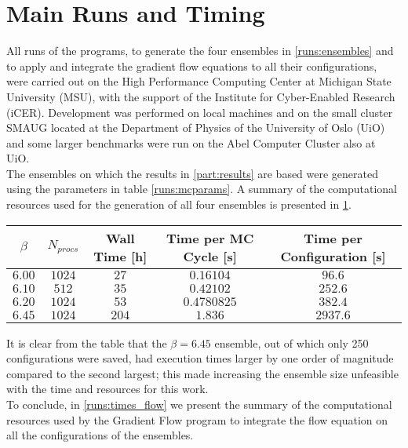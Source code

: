 \section{Main Runs and Timing}
All runs of the programs, to generate the four ensembles in \cref{runs:ensembles} and to apply and integrate the gradient flow equations to all their configurations, were carried out on the High Performance Computing Center at Michigan State University (MSU), with the support of the Institute for Cyber-Enabled Research (iCER). Development was performed on local machines and on the small cluster SMAUG located at the Department of Physics of the University of Oslo (UiO) and some larger benchmarks were run on the Abel Computer Cluster also at UiO.\\
The ensembles on which the results in \cref{part:results} are based were generated using the parameters in table \cref{runs:mcparams}. A summary of the computational resources used for the generation of all four ensembles is presented in \cref{runs:times}. 

\begin{table}[!htb]
    \begin{center}
    \begin{tabular}{ccccc}
        $\beta$ & $N_{procs}$ & Wall Time [h] & Time per MC Cycle [s] & Time per Configuration [s]\\\hline
        $6.00$ & $1024$ & $27$ & $0.16104$  & $96.6$\\
        $6.10$ & $512$ & $35$ & $0.42102$ & $252.6$\\
        $6.20$ & $1024$ & $53$ & $0.4780825$ & $382.4$ \\
        $6.45$ & $1024$ & $204$ & $1.836$ & $2937.6$
    \end{tabular}
    \label{runs:times} 
    \end{center}
\end{table}

It is clear from the table that the $\beta=6.45$ ensemble, out of which only 250 configurations were saved, had execution times larger by one order of magnitude compared to the second largest; this made increasing the ensemble size unfeasible with the time and resources for this work.\\
To conclude, in \cref{runs:times_flow} we present the summary of the computational resources used by the Gradient Flow program to integrate the flow equation on all the configurations of the ensembles.

